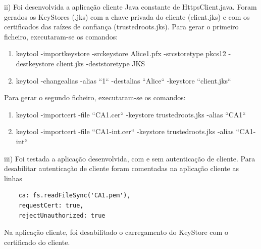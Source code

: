 \documentclass[11pt]{report}
\begin{document}
	ii) Foi desenvolvida a aplicação cliente Java constante de HttpsClient.java.
	Foram gerados os KeyStores (.jks) com a chave privada do cliente (client.jks) e com os certificados das raízes de confiança (trustedroots.jks). Para gerar o primeiro ficheiro, executaram-se os comandos:
	\begin{enumerate}
	\item keytool -importkeystore -srckeystore Alice\textunderscore1.pfx -srcstoretype pkcs12 -destkeystore client.jks -deststoretype JKS
	
	\item keytool -changealias -alias ``1`` -destalias ``Alice`` -keystore 
	``client.jks``
	\end{enumerate}
	Para gerar o segundo ficheiro, executaram-se os comandos:
	\begin{enumerate}
		\item keytool -importcert -file ``CA1.cer`` -keystore trustedroots.jks -alias ``CA1``
		\item keytool -importcert -file ``CA1-int.cer`` -keystore trustedroots.jks -alias ``CA1-int``
	\end{enumerate}

	iii) Foi testada a aplicação desenvolvida, com e sem autenticação de cliente. Para desabilitar autenticação de cliente foram comentadas na aplicação cliente as linhas
	\begin{lstlisting}
	ca: fs.readFileSync('CA1.pem'), 
	requestCert: true, 
	rejectUnauthorized: true 
	\end{lstlisting}
	Na aplicação cliente, foi desabilitado o carregamento do KeyStore com o certificado do cliente. 
\newpage
\end{document}

